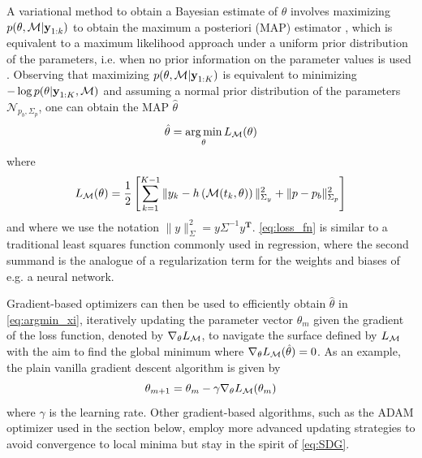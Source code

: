 A variational method to obtain a Bayesian estimate of $\theta$ involves maximizing $p(\theta, \mathcal{M} | \textbf{y}_{1:k})$ to obtain the maximum a posteriori (MAP) estimator \cite{Bocquet2019}, which is equivalent to a maximum likelihood approach under a uniform prior distribution of the parameters, i.e. when no prior information on the parameter values is used \cite{Schartau2017}. Observing that maximizing $p(\theta, \mathcal{M} | \textbf{y}_{1:K})$ is equivalent to minimizing $- \log p(\theta | \textbf{y}_{1:K}, \mathcal{M})$ and assuming a normal prior distribution of the parameters $\mathcal{N}_{p_b, \Sigma_p}$, one can obtain the MAP $\hat{\theta}$
\begin{equation}\label{eq:argmin_xi}
    \hat{\theta} = \operatorname*{arg\,min}_\theta  L_{\mathcal{M}}(\theta)
\end{equation}
%
where 
\begin{equation}\label{eq:loss_fn}
    \begin{split}
    L_{\mathcal{M}}(\theta) &= \frac{1}{2} \left[ \sum_{k=1}^{K-1} \|y_k - h\left(\mathcal{M}(t_k,\theta)\right)\|_{\Sigma_y}^2 + \|p - p_b\|_{\Sigma_p}^2 \right] \\
   \end{split}
\end{equation}
\cite{Schneider2017,Raue2009} and where we use the notation $\|y\|_\Sigma^2 = y \Sigma^{-1}y^{\textbf{T}}$.
%
\cref{eq:loss_fn} is similar to a traditional least squares function commonly used in regression, where the second summand is the analogue of a regularization term for the weights and biases of e.g. a neural network.

%
Gradient-based optimizers can then be used to efficiently obtain $\hat{\theta}$ in \cref{eq:argmin_xi}, iteratively updating the parameter vector $\theta_m$ given the gradient of the loss function, denoted by $\nabla_\theta L_{\mathcal{M}}$, to navigate the surface defined by $L_{\mathcal{M}}$ with the aim to find the global minimum where $\nabla_\theta L_{\mathcal{M}}(\hat{\theta}) = 0$. 
% 
As an example, the plain vanilla gradient descent algorithm is given by
\begin{equation}\label{eq:SDG}
    \theta_{m+1} = \theta_{m} - \gamma \nabla_\theta L_{\mathcal{M}}({\theta_m})
\end{equation}
where $\gamma$ is the learning rate. Other gradient-based algorithms, such as the ADAM optimizer used in the section below, employ more advanced updating strategies to avoid convergence to local minima but stay in the spirit of \cref{eq:SDG}.

